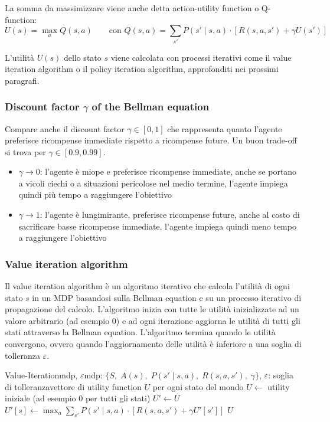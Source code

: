 La somma da massimizzare viene anche detta action-utility function o \hypertarget{q_function}{Q-function}:
\[U(s) = \max_a Q(s,a) \qquad \text{con } Q(s,a) = \sum_{s'} P(s' \mid s, a) \cdot [R(s,a,s') + \gamma U(s')]\]


L'utilità \(U(s)\) dello stato \(s\) viene calcolata con processi iterativi come il value iteration algorithm o il policy
iteration algorithm, approfonditi nei prossimi paragrafi.

\subsubsection*{Discount factor \(\gamma\) of the Bellman equation}
Compare anche il discount factor \(\gamma \in [0,1]\) che rappresenta quanto l'agente preferisce ricompense immediate rispetto
a ricompense future. Un buon trade-off si trova per \(\gamma \in [0.9, 0.99]\).
\begin{itemize}
	\item \(\gamma \to 0\): l'agente è miope e preferisce ricompense immediate, anche se portano a vicoli ciechi o a situazioni
	pericolose nel medio termine, l'agente impiega quindi più tempo a raggiungere l'obiettivo
	\item \(\gamma \to 1\): l'agente è lungimirante, preferisce ricompense future, anche al costo di sacrificare basse ricompense
	immediate, l'agente impiega quindi meno tempo a raggiungere l'obiettivo
\end{itemize}

\subsubsection*{Value iteration algorithm}
Il value iteration algorithm è un algoritmo iterativo che calcola l'utilità di ogni stato \(s\) in un MDP basandosi sulla
Bellman equation e su un processo iterativo di propagazione del calcolo. L'algoritmo inizia con tutte le utilità inizializzate
ad un valore arbitrario (ad esempio 0) e ad ogni iterazione aggiorna le utilità di tutti gli stati attraverso la Bellman equation.
L'algoritmo termina quando le utilità convergono, ovvero quando l'aggiornamento delle utilità è inferiore a una soglia di
tolleranza \(\varepsilon\).

\begin{algo}{Value-Iteration}{mdp, $\varepsilon$}{mdp: \(\{S, \; A(s), \; P(s' \mid s, a), \; R(s,a,s'), \; \gamma\}\), $\varepsilon$: soglia di tolleranza}{vettore di utility function $U$ per ogni stato del mondo}
	\State \(U \gets\) utility iniziale (ad esempio 0 per tutti gli stati)
	\Repeat
		\State \(U' \gets U\) 
		 
			\State \(U'[s] \gets \max_a \sum_{s'} P(s' \mid s, a) \cdot [R(s,a,s') + \gamma U'[s']]\) 
		\EndFor
	 
	\State \Return \(U\)
\end{algo}

